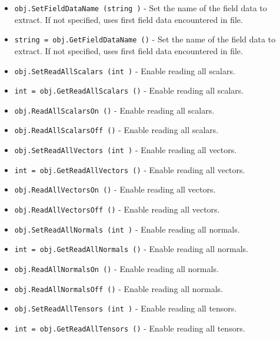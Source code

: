 \begin{itemize}
\item  \verb|obj.SetFieldDataName (string )| -  Set the name of the field data to extract. If not specified, uses 
 first field data encountered in file.

\item  \verb|string = obj.GetFieldDataName ()| -  Set the name of the field data to extract. If not specified, uses 
 first field data encountered in file.

\item  \verb|obj.SetReadAllScalars (int )| -  Enable reading all scalars. 

\item  \verb|int = obj.GetReadAllScalars ()| -  Enable reading all scalars. 

\item  \verb|obj.ReadAllScalarsOn ()| -  Enable reading all scalars. 

\item  \verb|obj.ReadAllScalarsOff ()| -  Enable reading all scalars. 

\item  \verb|obj.SetReadAllVectors (int )| -  Enable reading all vectors. 

\item  \verb|int = obj.GetReadAllVectors ()| -  Enable reading all vectors. 

\item  \verb|obj.ReadAllVectorsOn ()| -  Enable reading all vectors. 

\item  \verb|obj.ReadAllVectorsOff ()| -  Enable reading all vectors. 

\item  \verb|obj.SetReadAllNormals (int )| -  Enable reading all normals. 

\item  \verb|int = obj.GetReadAllNormals ()| -  Enable reading all normals. 

\item  \verb|obj.ReadAllNormalsOn ()| -  Enable reading all normals. 

\item  \verb|obj.ReadAllNormalsOff ()| -  Enable reading all normals. 

\item  \verb|obj.SetReadAllTensors (int )| -  Enable reading all tensors. 

\item  \verb|int = obj.GetReadAllTensors ()| -  Enable reading all tensors. 


\end{itemize}
